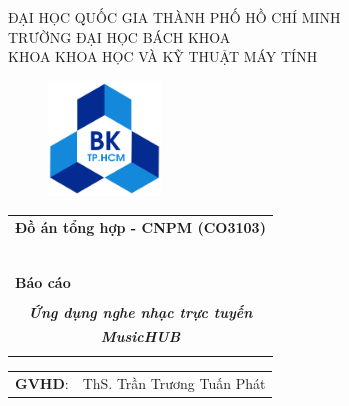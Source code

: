 \documentclass[a4paper]{article}
\begin{document}
\begin{titlepage}
	\begin{center}
		ĐẠI HỌC QUỐC GIA THÀNH PHỐ HỒ CHÍ MINH\\
		TRƯỜNG ĐẠI HỌC BÁCH KHOA\\
		KHOA KHOA HỌC VÀ KỸ THUẬT MÁY TÍNH\\
	\end{center}

	\vspace{1cm}

	\begin{figure}[h!]
		\begin{center}
			\includegraphics[width=3cm]{Images/hcmut.png}
		\end{center}
	\end{figure}

	\vspace{1cm}


	\begin{center}
		\begin{tabular}{c}
			\multicolumn{1}{c}{\textbf{{\Large Đồ án tổng hợp - CNPM (CO3103)}}} \\
			~~                                                                   \\
			\hline
			\\
			\multicolumn{1}{l}{\textbf{{\Large Báo cáo }}}                       \\
			\\
			\textbf{\textit{{\Huge Ứng dụng nghe nhạc trực tuyến}}}\vspace{5mm}  \\
			\textbf{\textit{{\Huge MusicHUB}}}                                   \\
			\\
			\hline
		\end{tabular}
	\end{center}

	\begin{table}[h]
		\centering
		\begin{tabular}{rl}
			\hspace{3 cm}\textbf{GVHD}:
			                    & ThS. Trần Trương Tuấn Phát                             \\


\end{tabular}
\end{table}
\end{titlepage}
\end{document}
